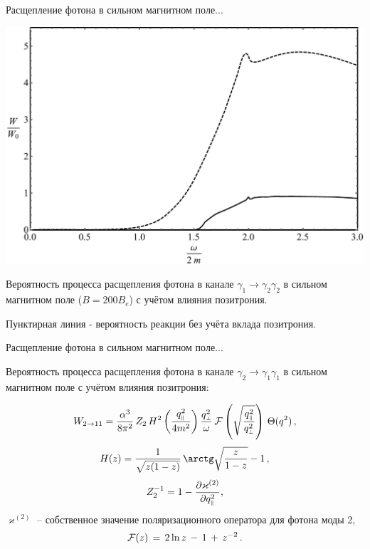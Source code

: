 \documentclass{beamer}
\def\mprp{\mbox{\tiny $\bot$}}
\def\mprl{\mbox{\tiny $\|$}}
\begin{document}
\begin{frame}{Расщепление фотона в сильном магнитном поле...}
\begin{center}
\includegraphics[scale=0.31]{122.pdf}

Вероятность процесса расщепления фотона в канале $\gamma_1 \to\gamma_2 \gamma_2$ в сильном 
магнитном поле ($B=200 B_e$) с учётом влияния позитрония.

Пунктирная линия - вероятность реакции без учёта вклада позитрония.
\end{center}
\end{frame}
\begin{frame}{Расщепление фотона в сильном магнитном поле...}
\begin{center}
Вероятность процесса расщепления фотона в канале $\gamma_2 \to\gamma_1 \gamma_1$ в сильном 
магнитном поле с учётом влияния позитрония:

$$W_{2 \to 11} = 
\frac{\alpha^3}{8\pi^2}\, Z_2\,  H^2\left(\frac{q^2_{\mprl}}{4m^2}\right)
\frac{q_{\mprp}^2}{\omega} \, {\cal F}\left
(\sqrt{\frac{q_{\mprl}^2}{q_{\mprp}^2}} \right) \, \Theta (q^2)\, ,$$
%
$$H(z)=\frac{1}{\sqrt{z(1 - z)}} \, \arctg \sqrt{\frac{z}{1 - z}} - 1 \, ,$$
%
$$Z_2^{-1} = 1 - \frac{\partial\varkappa^{(2)}}{\partial q_{\mprl}^2},$$ $\varkappa^{(2)}$ -- собственное значение поляризационного оператора 
для фотона моды 2,
%
$${\cal F}(z) \, = \, 2 \ln{z} \, - \, 1 \, + \, z^{-2} \, .$$

\end{center}
\end{frame}
\end{document}
